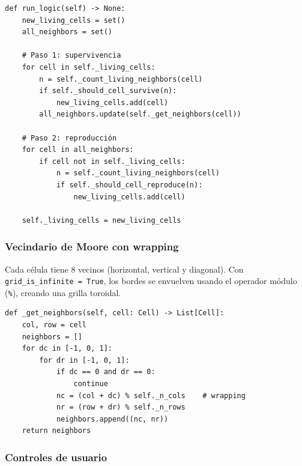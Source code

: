 \documentclass[12pt,a4paper]{article}
\begin{document}
\begin{lstlisting}
def run_logic(self) -> None:
    new_living_cells = set()
    all_neighbors = set()

    # Paso 1: supervivencia
    for cell in self._living_cells:
        n = self._count_living_neighbors(cell)
        if self._should_cell_survive(n):
            new_living_cells.add(cell)
        all_neighbors.update(self._get_neighbors(cell))

    # Paso 2: reproducción
    for cell in all_neighbors:
        if cell not in self._living_cells:
            n = self._count_living_neighbors(cell)
            if self._should_cell_reproduce(n):
                new_living_cells.add(cell)

    self._living_cells = new_living_cells
\end{lstlisting}

\subsubsection{Vecindario de Moore con wrapping}

Cada célula tiene 8 vecinos (horizontal, vertical y diagonal). Con \texttt{grid\_is\_infinite = True},
los bordes se envuelven usando el operador módulo (\texttt{\%}), creando una grilla toroidal.

\begin{lstlisting}
def _get_neighbors(self, cell: Cell) -> List[Cell]:
    col, row = cell
    neighbors = []
    for dc in [-1, 0, 1]:
        for dr in [-1, 0, 1]:
            if dc == 0 and dr == 0:
                continue
            nc = (col + dc) % self._n_cols    # wrapping
            nr = (row + dr) % self._n_rows
            neighbors.append((nc, nr))
    return neighbors
\end{lstlisting}

\subsubsection{Controles de usuario}
\end{document}
